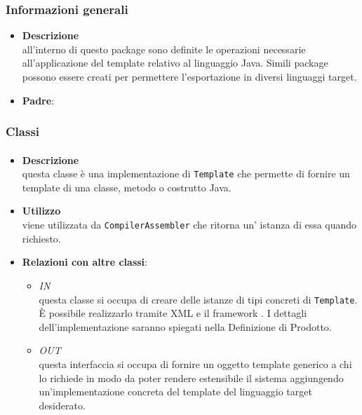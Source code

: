 \subsubsection{Informazioni generali}
\begin{itemize}
\item \textbf{Descrizione}\\
all'interno di questo package sono definite le operazioni necessarie all'applicazione del template relativo al linguaggio Java. Simili package possono essere creati per permettere l'esportazione in diversi linguaggi target.
\item \textbf{Padre}: \hyperref[\nogloxy{SWEDesigner::Server::Template}]{}
\end{itemize}
\subsubsection{Classi}
\paragraph{}
\label{\nogloxy{SWEDesigner::Server::Template::Java::JavaTemplate}}
\begin{itemize}
\item \textbf{Descrizione}\\
questa classe è una implementazione di \texttt{Template} che permette di fornire un template di una classe, metodo o costrutto Java.
\item \textbf{Utilizzo}\\
viene utilizzata da \texttt{CompilerAssembler} che ritorna un' istanza di essa quando richiesto.
\item \textbf{Relazioni con altre classi}:
\begin{itemize}
\item \textit{IN} \hyperref[\nogloxy{SWEDesigner::Server::Template::TemplateAssembler}]{}\\
questa classe si occupa di creare delle istanze di tipi concreti di \texttt{Template}. È possibile realizzarlo tramite XML e il framework \spring. I dettagli dell'implementazione saranno spiegati nella Definizione di Prodotto. %
\item \textit{OUT} \hyperref[\nogloxy{SWEDesigner::Server::Template::Template}]{}\\
questa interfaccia si occupa di fornire un oggetto template generico a chi lo richiede in modo da poter rendere estensibile il sistema aggiungendo un'implementazione concreta del template del linguaggio target desiderato.
\end{itemize}
\end{itemize}
